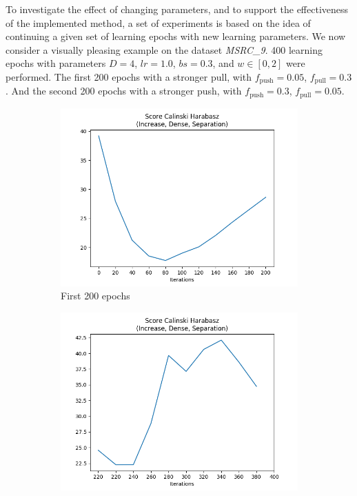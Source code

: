 		To investigate the effect of changing parameters, and to support the effectiveness of the implemented method, a set of experiments is based on the idea of continuing a given set of learning epochs with new learning parameters.
		We now consider a visually pleasing example on the dataset \textit{MSRC\_9}.
		400 learning epochs with parameters $D=4$, $lr=1.0$, $bs=0.3$, and $w\in[0,2]$ were performed.
		The first 200 epochs with a stronger pull, with $f_{\text{push}}=0.05$, $f_{\text{pull}}=0.3$.
		And the second 200 epochs with a stronger push, with $f_{\text{push}}=0.3$, $f_{\text{pull}}=0.05$.
		
		\begin{figure}[!ht]
			\centering
			\begin{subfigure}{0.49\textwidth}
				\centering
				\includegraphics[width=1.1\linewidth]{images/plotE6_CHS_MSRC_9_E_GDL_22_00h-05mExp3pull}
				\caption{First 200 epochs}
				\label{fig:plote6chsmsrc9egdl2200h-05mexp3pull}
			\end{subfigure}
			\begin{subfigure}{0.49\textwidth}
				\centering
				\includegraphics[width=1.1\linewidth]{images/plotE6_CHS_MSRC_9_E_GDL_22_00h-05mExp3pullpush}

\end{subfigure}
\end{figure}
